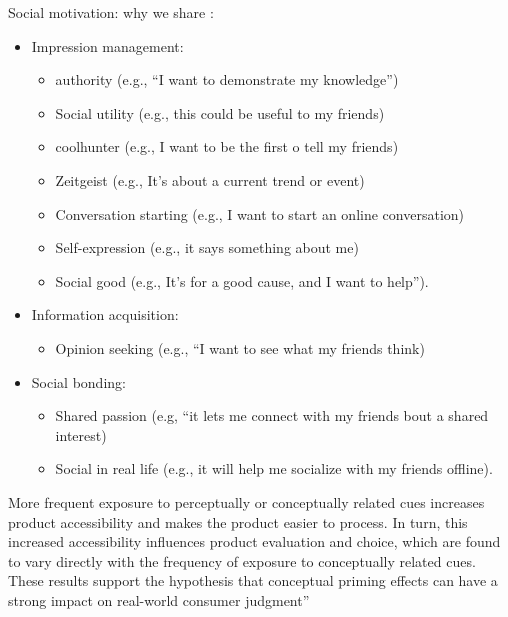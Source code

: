 \documentclass[
]{book}
\providecommand{\tightlist}{%
  \setlength{\itemsep}{0pt}\setlength{\parskip}{0pt}}
\begin{document}
Social motivation: why we share :\citep{why_some_videos_go_viral_2015}

\begin{itemize}
\tightlist
\item
  Impression management:

  \begin{itemize}
  \tightlist
  \item
    authority (e.g., ``I want to demonstrate my knowledge'')\\
  \item
    Social utility (e.g., this could be useful to my friends)\\
  \item
    coolhunter (e.g., I want to be the first o tell my friends)\\
  \item
    Zeitgeist (e.g., It's about a current trend or event)\\
  \item
    Conversation starting (e.g., I want to start an online conversation)\\
  \item
    Self-expression (e.g., it says something about me)\\
  \item
    Social good (e.g., It's for a good cause, and I want to help'').\\
  \end{itemize}
\item
  Information acquisition:

  \begin{itemize}
  \tightlist
  \item
    Opinion seeking (e.g., ``I want to see what my friends think)\\
  \end{itemize}
\item
  Social bonding:

  \begin{itemize}
  \tightlist
  \item
    Shared passion (e.g, ``it lets me connect with my friends bout a shared interest)\\
  \item
    Social in real life (e.g., it will help me socialize with my friends offline).
  \end{itemize}
\end{itemize}

More frequent exposure to perceptually or conceptually related cues increases product accessibility and makes the product easier to process. In turn, this increased accessibility influences product evaluation and choice, which are found to vary directly with the frequency of exposure to conceptually related cues. These results support the hypothesis that conceptual priming effects can have a strong impact on real-world consumer judgment'' \citep{Berger_2008}
\end{document}

